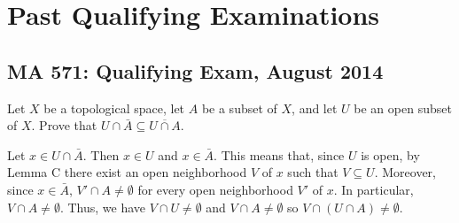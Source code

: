 \section{Past Qualifying Examinations}
\subsection{MA 571: Qualifying Exam, August 2014}
\setcounter{exercise}{0}
\begin{problem}
Let $X$ be a topological space, let $A$ be a subset of $X$, and let $U$ be
an open subset of $X$. Prove that $U\cap \bar A\subseteq\overline{U\cap A}$.
\end{problem}
\begin{solution}
Let $x\in U\cap\bar A$. Then $x\in U$ and $x\in\bar A$. This means that,
since $U$ is open, by Lemma C there exist an open neighborhood $V$ of $x$
such that $V\subseteq U$. Moreover, since $x\in\bar A$, $V'\cap
A\neq\emptyset$ for every open neighborhood $V'$ of $x$. In particular,
$V\cap A\neq\emptyset$. Thus, we have $V\cap U\neq\emptyset$ and $V\cap
A\neq\emptyset$ so $V\cap(U\cap A)\neq\emptyset$.
\end{solution}

